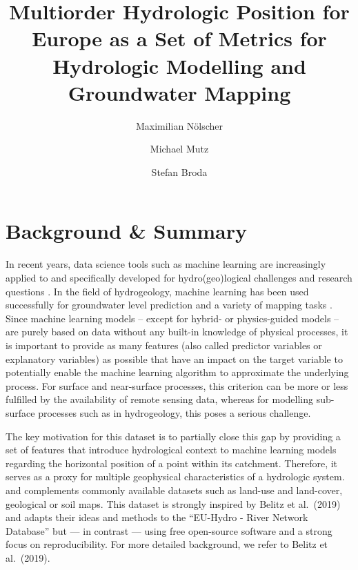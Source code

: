 \documentclass[fleqn,10pt]{wlscirep}
\title{Multiorder Hydrologic Position for Europe as a Set of Metrics for Hydrologic Modelling and Groundwater Mapping}
\author[*, 1]{Maximilian Nölscher}
\author[2]{Michael Mutz}
\author[1]{Stefan Broda}
\affil[1]{Federal Institute for Geosciences and Natural Resources (BGR), Berlin, 13593, Germany}
\affil[2]{independent researcher}
\affil[*]{corresponding author: Maximilian Nölscher (maximilian.noelscher@bgr.de, max-n@posteo.de)}
\begin{document}
\flushbottom
\maketitle

\thispagestyle{empty}

\hypertarget{background-summary}{%
\section*{Background \& Summary}\label{background-summary}}

In recent years, data science tools such as machine learning are increasingly applied to and specifically developed for hydro(geo)logical challenges and research questions \cite{zounemat-kermani_neurocomputing_2020,sit_comprehensive_2020}. In the field of hydrogeology, machine learning has been used successfully for groundwater level prediction and a variety of mapping tasks \cite{desimone_machine-learning_2020, knoll_large_2019, knoll_nation-wide_2020, mueller_surrogate_2019, stackelberg_machine_2021, wang_comparison_2016, wunsch_forecasting_2018, wunsch_groundwater_2020}. Since machine learning models -- except for hybrid- or physics-guided models -- are purely based on data without any built-in knowledge of physical processes, it is important to provide as many features (also called predictor variables or explanatory variables) as possible that have an impact on the target variable to potentially enable the machine learning algorithm to approximate the underlying process. For surface and near-surface processes, this criterion can be more or less fulfilled by the availability of remote sensing data, whereas for modelling sub-surface processes such as in hydrogeology, this poses a serious challenge.

The key motivation for this dataset is to partially close this gap by providing a set of features that introduce hydrological context to machine learning models regarding the horizontal position of a point within its catchment. Therefore, it serves as a proxy for multiple geophysical characteristics of a hydrologic system. and complements commonly available datasets such as land-use and land-cover, geological or soil maps.
This dataset is strongly inspired by Belitz et al.~(2019)\cite{belitz_multiorder_2019} and adapts their ideas and methods to the ``EU-Hydro - River Network Database''\cite{noauthor_eu-hydro_2021} but --- in contrast --- using free open-source software and a strong focus on reproducibility. For more detailed background, we refer to Belitz et al.~(2019)\cite{belitz_multiorder_2019}.
\end{document}

